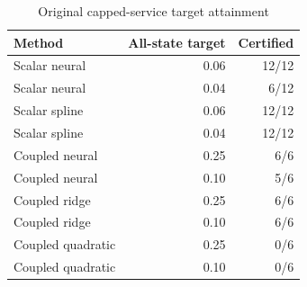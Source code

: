 \begin{table}[htbp]
\centering\small
\caption{Original capped-service target attainment}
\label{tab:attainment}
\begin{tabular}{lrr}
\toprule
Method & All-state target & Certified\\
\midrule
Scalar neural & 0.06 & 12/12\\
Scalar neural & 0.04 & 6/12\\
Scalar spline & 0.06 & 12/12\\
Scalar spline & 0.04 & 12/12\\
Coupled neural & 0.25 & 6/6\\
Coupled neural & 0.10 & 5/6\\
Coupled ridge & 0.25 & 6/6\\
Coupled ridge & 0.10 & 6/6\\
Coupled quadratic & 0.25 & 0/6\\
Coupled quadratic & 0.10 & 0/6\\
\bottomrule
\end{tabular}
\end{table}
